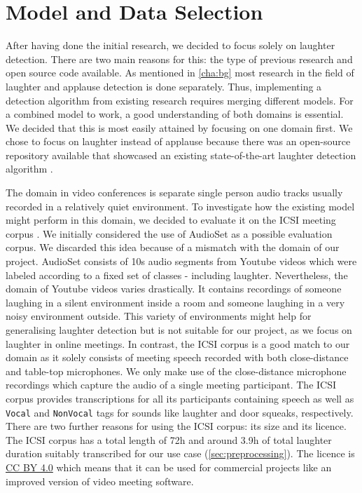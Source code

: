 \documentclass[bsc,frontabs,parskip,deptreport]{infthesis}
\begin{document}
\section{Model and Data Selection}\label{sec:model-and-data}
After having done the initial research, we decided to focus solely on laughter detection. 
There are two main reasons for this: the type of previous research and open source code available.  
As mentioned in \autoref{cha:bg} most research in the field of laughter and applause detection is done separately. 
Thus, implementing a detection algorithm from existing research requires merging different models. 
For a combined model to work, a good understanding of both domains is essential.
We decided that this is most easily attained by focusing on one domain first. 
We chose to focus on laughter instead of applause because there was an open-source repository available that showcased an existing state-of-the-art laughter detection algorithm \citep{gillick-codebase, gillick2021robust}.

The domain in video conferences is separate single person audio tracks usually recorded in a relatively quiet environment.
To investigate how the existing model might perform in this domain, we decided to evaluate it on the ICSI meeting corpus \citep{morgan2001meeting}. 
We initially considered the use of AudioSet \citep{googleaudioset} as a possible evaluation corpus. We discarded this idea because of a mismatch with the domain of our project. AudioSet  consists of 10s audio segments from Youtube videos which were labeled according to a fixed set of classes - including laughter. Nevertheless, the domain of Youtube videos varies drastically. It contains recordings of someone laughing in a silent environment inside a room and someone laughing in a very noisy environment outside. This variety of environments might help for generalising laughter detection but is not suitable for our project, as we focus on laughter in online meetings.
In contrast, the ICSI corpus is a good match to our domain as it solely consists of meeting speech recorded with both close-distance and table-top microphones. 
We only make use of the close-distance microphone recordings which capture the audio of a single meeting participant.
The ICSI corpus provides transcriptions for all its participants containing speech as well as \texttt{Vocal} and \texttt{NonVocal} tags for sounds like laughter and door squeaks, respectively.
There are two further reasons for using the ICSI corpus: its size and its licence.
The ICSI corpus has a total length of 72h and around 3.9h of total laughter duration suitably transcribed for our use case (\autoref{sec:preprocessing}).
The licence is \href{https://creativecommons.org/licenses/by/4.0/legalcode}{CC BY 4.0} which means that it can be used for commercial projects like an improved version of video meeting software. 
\end{document}
